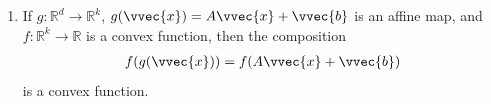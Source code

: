 \documentclass[letterpaper,10pt,english]{jupyterBook}
\begin{document}
\begin{enumerate}
\begin{sphinxuseclass}{toggle}
\begin{align*}
f(\alpha\vvec{x}+(1-\alpha)\vvec{y}) &= \lambda_1 f_1(\alpha\vvec{x}+(1-\alpha)\vvec{y})+\ldots + \lambda_k f_k(\alpha\vvec{x}+(1-\alpha)\vvec{y})\\
&= \sum_{i=1}^k \lambda_i f_i(\alpha\vvec{x}+(1-\alpha)\vvec{y})\\
&\leq 
\sum_{i=1}^k \alpha \lambda_i f_i(\vvec{x})+(1-\alpha)\lambda_i f_i(\vvec{y})&\text{apply Eq.~\eqref{eq:ficonv}}\\
&=
\alpha \sum_{i=1}^k \lambda_i f_i(\vvec{x})+(1-\alpha)\sum_{i=1}^k\lambda_i f_i(\vvec{y})\\
&=\alpha f(\vvec{x}) + (1-\alpha)f(\vvec{y}).&\text{apply definition of $f$}
\end{align*}
\sphinxAtStartPar
This concludes what we wanted to show.

\end{sphinxuseclass}
\item {} 
\sphinxAtStartPar
If \(g:\mathbb{R}^d\rightarrow \mathbb{R}^k\), \(g(\vvec{x})=A\vvec{x}+\vvec{b}\) is an affine map, and \(f:\mathbb{R}^k\rightarrow \mathbb{R}\) is a convex function, then the composition
\begin{equation*}
\begin{split}f(g(\vvec{x}))=f(A\vvec{x}+\vvec{b})\end{split}
\end{equation*}
is a convex function.


\end{enumerate}
\end{document}
